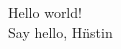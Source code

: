 \documentclass[10pt]{article}
\begin{document}
Hello world! \\
Say hello, H{\"n}stin\\
\end{document}
